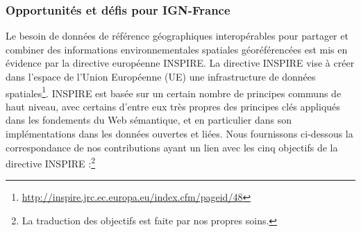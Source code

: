 \subsubsection*{Opportunit\'{e}s et d\'{e}fis pour IGN-France}
\label{sec:challenges}
Le besoin de donn\'{e}es de r\'{e}f\'{e}rence g\'{e}ographiques interop\'{e}rables pour partager et combiner des informations environnementales spatiales g\'{e}or\'{e}f\'{e}renc\'{e}es est mis en \'{e}vidence par la directive europ\'{e}enne INSPIRE. La directive INSPIRE vise à cr\'{e}er dans l'espace de l'Union Europ\'{e}enne (UE) une infrastructure de donn\'{e}es spatiales\footnote{\url{http://inspire.jrc.ec.europa.eu/index.cfm/pageid/48}}. INSPIRE est bas\'{e}e sur un certain nombre de principes communs de haut niveau, avec certains d'entre eux tr\`{e}s propres des principes cl\'{e}s appliqu\'{e}s dans les fondements du Web s\'{e}mantique, et en particulier dans son impl\'{e}mentations dans les donn\'{e}es ouvertes et li\'{e}es. Nous fournissons ci-dessous la correspondance de nos contributions ayant un lien avec les cinq objectifs de la directive INSPIRE :\footnote{La traduction des objectifs est faite par nos propres soins.}
